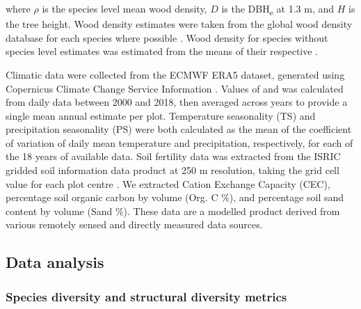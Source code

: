 \documentclass[11pt,a4paper]{article}
\newcommand{\todo}[1]{\textcolor{red}{\textbf{#1}}}   %
\begin{document}
where $\rho$ is the species level mean wood density, $D$ is the DBH\textsubscript{e} at 1.3 m, and $H$ is the tree height. Wood density estimates were taken from the global wood density database for each species where possible \citep{Chave2009, Zanne2009}. Wood density for species without species level estimates was estimated from the means of their respective . 

Climatic data were collected from the ECMWF ERA5 dataset, generated using Copernicus Climate Change Service Information \citep{ERA5}. Values of  and  was calculated from daily data between 2000 and 2018, then averaged across years to provide a single mean annual estimate per plot. Temperature seasonality (TS) and precipitation seasonality (PS) were both calculated as the mean of the coefficient of variation of daily mean temperature and precipitation, respectively, for each of the 18 years of available data. Soil fertility data was extracted from the ISRIC gridded soil information data product at 250 m resolution, taking the grid cell value for each plot centre \citep{Hengl2017}. We extracted Cation Exchange Capacity (CEC), percentage soil organic carbon by volume (Org. C \%), and percentage soil sand content by volume (Sand \%). These data are a modelled product derived from various remotely sensed and directly measured data sources. 

% 
% 

\subsection{Data analysis}

\subsubsection{Species diversity and structural diversity metrics}
\end{document}
